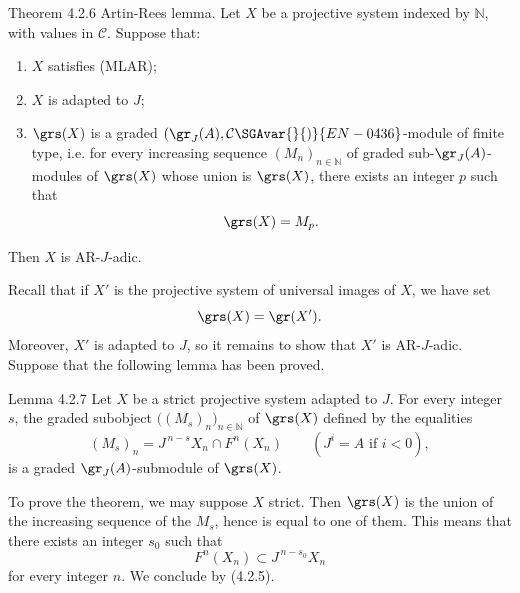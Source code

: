 \begin{statement}{Theorem 4.2.6}
Artin-Rees lemma. Let \(X\) be a projective system indexed by \(\mathbb N\), with values in \(\mathcal C\). Suppose that:
\begin{enumerate}[label=\textup{(\roman*)}]
\item \(X\) satisfies (MLAR);
\item \(X\) is adapted to \(J\);
\item \(\grs(X)\) is a graded \((\gr_J(A),\mathcal C\SGAvar{}{)}{EN-0436}\)-module of finite type, i.e. for every increasing sequence \((M_n)_{n\in\mathbb N}\) of graded sub-\(\gr_J(A)\)-modules of \(\grs(X)\) whose union is \(\grs(X)\), there exists an integer \(p\) such that
\[
\grs(X)=M_p.
\]
\end{enumerate}
Then \(X\) is AR-\(J\)-adic.
\end{statement}

\begin{prooftext}
Recall that if \(X'\) is the projective system of universal images of \(X\), we have set
\[
\grs(X)=\gr(X').
\]
Moreover, \(X'\) is adapted to \(J\), so it remains to show that \(X'\) is AR-\(J\)-adic. Suppose that the following lemma has been proved.
\end{prooftext}

\begin{statement}{Lemma 4.2.7}
Let \(X\) be a strict projective system adapted to \(J\). For every integer \(s\), the graded subobject \(\bigl((M_s)_n\bigr)_{n\in\mathbb N}\) of \(\grs(X)\) defined by the equalities
\[
(M_s)_n=J^{\,n-s}X_n\cap F^n(X_n)\qquad(J^i=A\text{ if }i<0),
\]
is a graded \(\gr_J(A)\)-submodule of \(\grs(X)\).
\end{statement}

To prove the theorem, we may suppose \(X\) strict. Then \(\grs(X)\) is the union of the increasing sequence of the \(M_s\), hence is equal to one of them. This means that there exists an integer \(s_0\) such that
\[
F^n(X_n)\subset J^{\,n-s_0}X_n
\]
for every integer \(n\). We conclude by (4.2.5).

